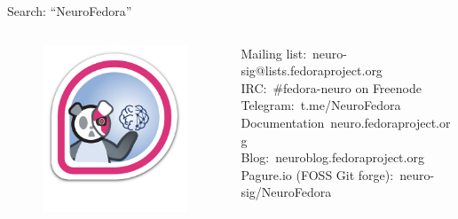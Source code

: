 \begin{frame}[c]{Search: ``NeuroFedora''}
	\begin{columns}
		\begin{column}{0.3\textwidth}
			\begin{figure}[h]
				\centering
				\includegraphics[width=\linewidth]{images/NeuroFedoraBadge.png}
			\end{figure}
		\end{column}
		\begin{column}{0.8\textwidth}
			\textcolor{FedoraBlue}{Mailing list:\ neuro-sig@lists.fedoraproject.org}\\
			\textcolor{FirstGreen}{IRC:\ \#fedora-neuro on Freenode}\\
			\textcolor{FeaturesOrange}{Telegram:\ t.me/NeuroFedora}\\
			\textcolor{FriendsMagenta}{Documentation\ neuro.fedoraproject.org}\\
			\textcolor{FirstGreen}{Blog:\ neuroblog.fedoraproject.org}\\
			\textcolor{FeaturesOrange}{Pagure.io (FOSS Git forge):\ neuro-sig/NeuroFedora}
		\end{column}
	\end{columns}
\end{frame}


